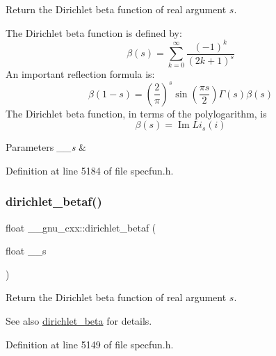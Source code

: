 Return the Dirichlet beta function of real argument $ s $.

The Dirichlet beta function is defined by\+: \[ \beta(s) = \sum_{k=0}^\infty \frac{(-1)^k}{(2k+1)^s} \] An important reflection formula is\+: \[ \beta(1-s) = \left( \frac{2}{\pi}\right)^s \sin(\frac{\pi s}{2}) \Gamma(s) \beta(s) \] The Dirichlet beta function, in terms of the polylogarithm, is \[ \renewcommand\Re{\operatorname{Re}} \renewcommand\Im{\operatorname{Im}} \beta(s) = \Im{Li_s(i)} \]


\begin{DoxyParams}{Parameters}
{\em \+\_\+\+\_\+s} & \\
\hline
\end{DoxyParams}


Definition at line 5184 of file specfun.\+h.

\mbox{\label{group__gnu__math__spec__func_ga9bb40e20b18e3eb822e70af955940830}} 
\subsubsection{\texorpdfstring{dirichlet\+\_\+betaf()}{dirichlet\_betaf()}}
{\footnotesize\ttfamily float \+\_\+\+\_\+gnu\+\_\+cxx\+::dirichlet\+\_\+betaf (\begin{DoxyParamCaption}\item[{float}]{\+\_\+\+\_\+s }\end{DoxyParamCaption})\hspace{0.3cm}{\ttfamily [inline]}}

Return the Dirichlet beta function of real argument $ s $.

\begin{DoxySeeAlso}{See also}
\hyperlink{group__gnu__math__spec__func_ga87466a2d429a2815d794acc21c882b08}{dirichlet\+\_\+beta} for details. 
\end{DoxySeeAlso}


Definition at line 5149 of file specfun.\+h.

\mbox{\label{group__gnu__math__spec__func_gaed6fd85a4577f4de66d74742a1850a13}} 
